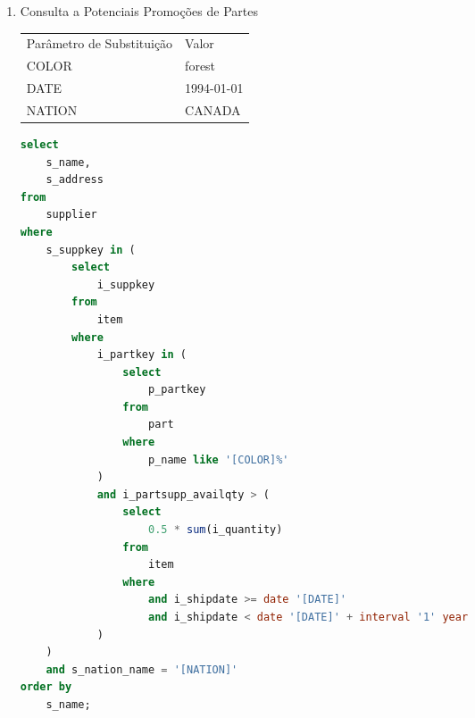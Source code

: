 \begin{enumerate}
	\begin{lstlisting}[language=SQL]
select
    sum(i_extendedprice* (1 - i_discount)) as revenue
from
    item,
    part
where
    (
        p_partkey = i_partkey
        and p_brand = '[BRAND1]'
        and p_container in ('SM CASE', 'SM BOX', 'SM PACK', 'SM PKG')
        and i_quantity >= [QUANTITY1] and i_quantity <= [QUANTITY1] + 10
        and p_size between 1 and 5
        and i_shipmode in ('AIR', 'AIR REG')
        and i_shipinstruct = 'DELIVER IN PERSON'
    )
    or
    (
        p_partkey = i_partkey
        and p_brand = '[BRAND2]'
        and p_container in ('MED BAG', 'MED BOX', 'MED PKG', 'MED PACK')
        and i_quantity >= [QUANTITY2] and i_quantity <= [QUANTITY2] + 10
        and p_size between 1 and 10
        and i_shipmode in ('AIR', 'AIR REG')
        and i_shipinstruct = 'DELIVER IN PERSON'
    )
    or
    (
        p_partkey = i_partkey
        and p_brand = '[BRAND3]'
        and p_container in ('LG CASE', 'LG BOX', 'LG PACK', 'LG PKG')
        and i_quantity >= [QUANTITY3] and i_quantity <= [QUANTITY3] + 10
        and p_size between 1 and 15
        and i_shipmode in ('AIR', 'AIR REG')
        and i_shipinstruct = 'DELIVER IN PERSON'
    );
	\end{lstlisting}

\item[Q20 --] Consulta a Potenciais Promoções de Partes

\begin{tabular}{ll}
	Parâmetro de Substituição & Valor\\
	COLOR & forest\\
	DATE & 1994-01-01\\
	NATION & CANADA\\
\end{tabular}

	\begin{lstlisting}[language=SQL]
select
    s_name,
    s_address
from
    supplier
where
    s_suppkey in (
        select
            i_suppkey
        from
            item
        where
            i_partkey in (
                select
                    p_partkey
                from
                    part
                where
                    p_name like '[COLOR]%'
            )
            and i_partsupp_availqty > (
                select
                    0.5 * sum(i_quantity)
                from
                    item
                where
                    and i_shipdate >= date '[DATE]'
                    and i_shipdate < date '[DATE]' + interval '1' year
            )
    )
    and s_nation_name = '[NATION]'
order by
    s_name;


\end{lstlisting}
\end{enumerate}
